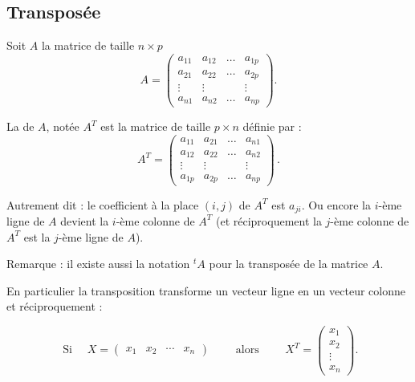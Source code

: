 \documentclass[11pt,class=report,crop=false]{standalone}
\begin{document}
\subsection{Transposée}

Soit $A$ la matrice de taille $n\times p$
$$
A = \left(
\begin{array}{cccc}
	a_{11} & a_{12} & \dots & a_{1p}\\
	a_{21} & a_{22} & \dots & a_{2p}\\
	\vdots & \vdots &&\vdots\\
	a_{n1} & a_{n2} & \dots & a_{np}
\end{array}\right).
$$

La  de $A$, notée $A^T$ est la matrice de taille $p \times n$ définie par :
$$
A^T = \left(
\begin{array}{cccc}
	a_{11} & a_{21} & \dots & a_{n1}\\
	a_{12} & a_{22} & \dots & a_{n2}\\
	\vdots & \vdots &&\vdots\\
	a_{1p} & a_{2p} &\dots & a_{np}
\end{array}\right)\, .
	$$

Autrement dit : le coefficient à la place $(i,j)$ de $A^T$  est $a_{ji}$.
Ou encore la $i$-ème ligne de $A$ devient la $i$-ème colonne de $A^{T}$
(et réciproquement la $j$-ème colonne de $A^T$ est la $j$-ème ligne de $A$).

Remarque : il existe aussi la notation $^{t\!}A$ pour la transposée de la matrice $A$.


En particulier la transposition transforme un vecteur ligne en un vecteur colonne et réciproquement :
 
$$\text{ Si } \quad X = \begin{pmatrix}x_1 & x_2 & \cdots & x_n \end{pmatrix}
\qquad\text{ alors }\qquad 
X^T = \begin{pmatrix}x_1 \\ x_2 \\ \vdots \\ x_n \end {pmatrix}.$$
	
	
\bigskip
\end{document}
